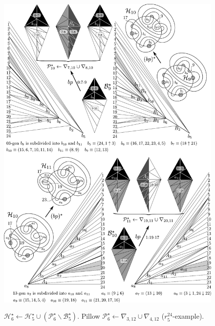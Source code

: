 \begin{figure}
\begin{center}
\includegraphics[width=15cm]{A.figs/bpandwinglist91011.pdf} \\
\caption{\sf 
$\mathcal{H}^\star_{6} \leftarrow \mathcal{H}^\star_5 
\cup (\mathcal{P}_{6}^\star \backslash \mathcal{B}_5^\star)$. 
Pillow $\mathcal{P}_{6}^\star \leftarrow 
\nabla_{3,12}\cup \nabla_{4,12}$
($r^{24}_5$-example).}
\label{fig:winglist05}
\end{center}
\end{figure}


